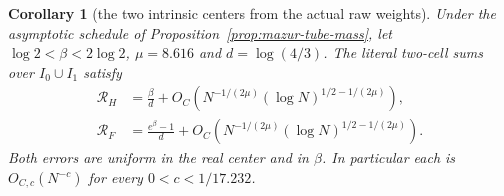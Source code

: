 \documentclass[11pt]{article}
\newtheorem{corollary}[proposition]{Corollary}
\theoremstyle{remark}\newtheorem{remark}[proposition]{Remark}
\begin{document}
\begin{corollary}[the two intrinsic centers from the actual raw weights]
\label{cor:mazur-intrinsic-centers}
Under the asymptotic schedule of
Proposition~\ref{prop:mazur-tube-mass}, let
$\log2<\beta<2\log2$, $\mu=8.616$ and $d=\log(4/3)$.
The literal two-cell sums over $I_0\cup I_1$ satisfy
\begin{align}
 \mathcal R_H&=\frac{\beta}{d}
       +O_C\!\left(N^{-1/(2\mu)}
                         (\log N)^{1/2-1/(2\mu)}\right),\\
 \mathcal R_F&=\frac{e^\beta-1}{d}
       +O_C\!\left(N^{-1/(2\mu)}
                         (\log N)^{1/2-1/(2\mu)}\right).
 \label{eq:mazur-intrinsic-centers}
\end{align}
Both errors are uniform in the real center and in $\beta$.
In particular each is $O_{C,c}(N^{-c})$ for every
$0<c<1/17.232$.
\end{corollary}
\end{document}
